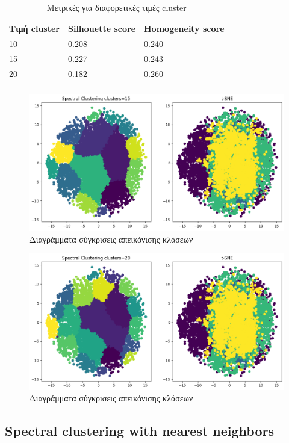 \begin{table}[ht]
	\centering
	\caption{Μετρικές για διαφορετικές τιμές cluster}
	\begin{tabular}{l | l | l}
		Τιμή cluster & Silhouette score &  Homogeneity score\\
		\hline
		10 & 0.208 & 0.240\\
		15 & 0.227&0.243\\
		20 & 0.182 & 0.260\\
		\label{tab:abc6}
	\end{tabular}
\end{table}
\begin{figure}[ht]
	\centering
	\includegraphics[width=1\linewidth]{Imagedata1/rbf_15tsne1.png}
	\caption{ Διαγράμματα σύγκρισεις απεικόνισης κλάσεων }
	\label{f:g12}	
\end{figure}

\begin{figure}[ht]
	\centering
	\includegraphics[width=1\linewidth]{Imagedata1/rbf_20tsne1.png}
	\caption{ Διαγράμματα σύγκρισεις απεικόνισης κλάσεων }
	\label{f:g13}	
\end{figure}
\clearpage

	\subsection{Spectral clustering with nearest neighbors}
	
